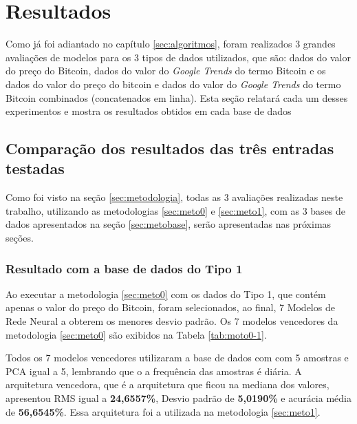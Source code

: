 \section{Resultados}

Como já foi adiantado no capítulo \ref{sec:algoritmos}, foram realizados 3 grandes avaliações de modelos para os 3 tipos de dados utilizados, que são: dados do valor do preço do Bitcoin, dados do valor do \textit{Google Trends} do termo Bitcoin e os dados do valor do preço do bitcoin e dados do valor do \textit{Google Trends} do termo Bitcoin combinados (concatenados em linha). Esta seção relatará cada um desses experimentos e mostra os resultados obtidos em cada base de dados


\subsection{Comparação dos resultados das três entradas testadas}

Como foi visto na seção \ref{sec:metodologia}, todas as 3 avaliações realizadas neste trabalho, utilizando as metodologias \ref{sec:meto0} e \ref{sec:meto1}, com as 3 bases de dados apresentados na seção \ref{sec:metobase}, serão apresentadas nas próximas seções.

\subsubsection{Resultado com a base de dados do Tipo 1}

Ao executar a metodologia \ref{sec:meto0} com os dados do Tipo 1, que contém apenas o valor do preço do Bitcoin, foram selecionados, ao final, 7 Modelos de Rede Neural a obterem os menores desvio padrão. Os 7 modelos vencedores da metodologia \ref{sec:meto0} são exibidos na Tabela \ref{tab:moto0-1}.

Todos os 7 modelos vencedores utilizaram a base de dados com com 5 amostras e PCA igual a 5, lembrando que o a frequência das amostras é diária. A arquitetura vencedora, que é a arquitetura que ficou na mediana dos valores, apresentou RMS igual a \textbf{24,6557\%}, Desvio padrão de \textbf{5,0190\%} e acurácia média de \textbf{56,6545\%}. Essa arquitetura foi a utilizada na metodologia \ref{sec:meto1}.

